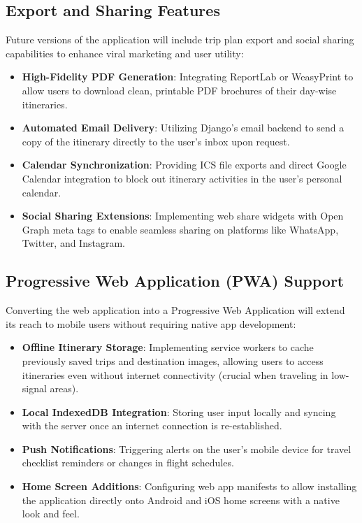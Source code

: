 \subsection{Export and Sharing Features}

Future versions of the application will include trip plan export and social sharing capabilities to enhance viral marketing and user utility:
\begin{itemize}
    \item \textbf{High-Fidelity PDF Generation}: Integrating ReportLab or WeasyPrint to allow users to download clean, printable PDF brochures of their day-wise itineraries.
    \item \textbf{Automated Email Delivery}: Utilizing Django's email backend to send a copy of the itinerary directly to the user's inbox upon request.
    \item \textbf{Calendar Synchronization}: Providing ICS file exports and direct Google Calendar integration to block out itinerary activities in the user's personal calendar.
    \item \textbf{Social Sharing Extensions}: Implementing web share widgets with Open Graph meta tags to enable seamless sharing on platforms like WhatsApp, Twitter, and Instagram.
\end{itemize}

\subsection{Progressive Web Application (PWA) Support}

Converting the web application into a Progressive Web Application will extend its reach to mobile users without requiring native app development:
\begin{itemize}
    \item \textbf{Offline Itinerary Storage}: Implementing service workers to cache previously saved trips and destination images, allowing users to access itineraries even without internet connectivity (crucial when traveling in low-signal areas).
    \item \textbf{Local IndexedDB Integration}: Storing user input locally and syncing with the server once an internet connection is re-established.
    \item \textbf{Push Notifications}: Triggering alerts on the user's mobile device for travel checklist reminders or changes in flight schedules.
    \item \textbf{Home Screen Additions}: Configuring web app manifests to allow installing the application directly onto Android and iOS home screens with a native look and feel.
\end{itemize}

